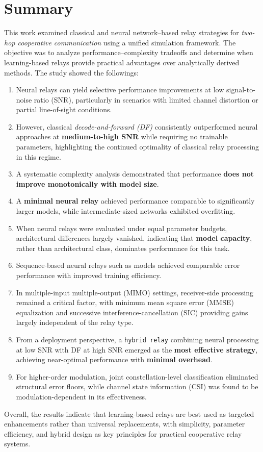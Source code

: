 \chapter {Summary}
\noindent
This work examined classical and neural network–based relay strategies for \textit{two-hop cooperative communication} using a unified simulation framework. The objective was to analyze performance–complexity tradeoffs and determine when learning-based relays provide practical advantages over analytically derived methods.
The study showed the followings:
\begin{enumerate}
    \item Neural relays can yield selective performance improvements at low signal-to-noise ratio (SNR), particularly in scenarios with limited channel distortion or partial line-of-sight conditions.
    \item However, classical \textit{decode-and-forward (DF)} consistently outperformed neural approaches at \textbf{medium-to-high SNR} while requiring no trainable parameters, highlighting the continued optimality of classical relay processing in this regime. 
    \item A systematic complexity analysis demonstrated that performance \textbf{does not improve monotonically with model size}. 
    \item A \textbf{minimal neural relay} achieved performance comparable to significantly larger models, while intermediate-sized networks exhibited overfitting. 
    \item When neural relays were evaluated under equal parameter budgets, architectural differences largely vanished, indicating that \textbf{model capacity}, rather than architectural class, dominates performance for this task.
    \item Sequence-based neural relays  such as  models achieved comparable error performance with improved training efficiency. 
    \item In multiple-input multiple-output (MIMO) settings, receiver-side processing remained a critical factor, with minimum mean square error (MMSE) equalization and successive interference-cancellation (SIC) providing gains largely independent of the relay type.
    \item From a deployment perspective, a \texttt{hybrid relay} combining neural processing at low SNR with DF at high SNR emerged as the \textbf{most effective strategy}, achieving near-optimal performance with \textbf{minimal overhead}. 
    \item For higher-order modulation, joint constellation-level classification eliminated structural error floors, while channel state information (CSI) was found to be modulation-dependent in its effectiveness.    
\end{enumerate}

Overall, the results indicate that learning-based relays are best used as targeted enhancements rather than universal replacements, with simplicity, parameter efficiency, and hybrid design as key principles for practical cooperative relay systems.
